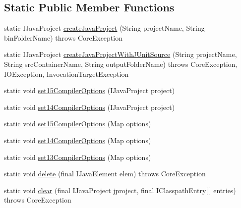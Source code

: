 \subsection*{Static Public Member Functions}
\begin{DoxyCompactItemize}
\item 
static IJavaProject \hyperlink{classorg_1_1eclipse_1_1jdt_1_1ui_1_1tests_1_1refactoring_1_1infra_1_1JavaProjectHelper_a8b7b9e680b2757f0cf2dbed6972422e8}{createJavaProject} (String projectName, String binFolderName)  throws CoreException 
\item 
static IJavaProject \hyperlink{classorg_1_1eclipse_1_1jdt_1_1ui_1_1tests_1_1refactoring_1_1infra_1_1JavaProjectHelper_a3b76ed2e1cd6b7e11fec59ba4e60b04b}{createJavaProjectWithJUnitSource} (String projectName, String srcContainerName, String outputFolderName)  throws CoreException, IOException, InvocationTargetException 
\item 
static void \hyperlink{classorg_1_1eclipse_1_1jdt_1_1ui_1_1tests_1_1refactoring_1_1infra_1_1JavaProjectHelper_a1aa1a0ef7d7adba1862ba8bc6254baa2}{set15CompilerOptions} (IJavaProject project)
\item 
static void \hyperlink{classorg_1_1eclipse_1_1jdt_1_1ui_1_1tests_1_1refactoring_1_1infra_1_1JavaProjectHelper_a0ac66e905c063a83ad51194c310f1e6a}{set14CompilerOptions} (IJavaProject project)
\item 
static void \hyperlink{classorg_1_1eclipse_1_1jdt_1_1ui_1_1tests_1_1refactoring_1_1infra_1_1JavaProjectHelper_a8e1c9f655eb4dd2dd754dc04e0b1c5fd}{set15CompilerOptions} (Map options)
\item 
static void \hyperlink{classorg_1_1eclipse_1_1jdt_1_1ui_1_1tests_1_1refactoring_1_1infra_1_1JavaProjectHelper_a83b10b111cb7702370fb6581219c9417}{set14CompilerOptions} (Map options)
\item 
static void \hyperlink{classorg_1_1eclipse_1_1jdt_1_1ui_1_1tests_1_1refactoring_1_1infra_1_1JavaProjectHelper_a97c8f1ec5471ba53d2a6ed372ffda525}{set13CompilerOptions} (Map options)
\item 
static void \hyperlink{classorg_1_1eclipse_1_1jdt_1_1ui_1_1tests_1_1refactoring_1_1infra_1_1JavaProjectHelper_a5e54a9c4511173e7739ce8e809c325c9}{delete} (final IJavaElement elem)  throws CoreException 
\item 
static void \hyperlink{classorg_1_1eclipse_1_1jdt_1_1ui_1_1tests_1_1refactoring_1_1infra_1_1JavaProjectHelper_a5a34fceaddd0e5312f04f4bfe6f1ed3c}{clear} (final IJavaProject jproject, final IClasspathEntry\mbox{[}$\,$\mbox{]} entries)  throws CoreException 

\end{DoxyCompactItemize}

